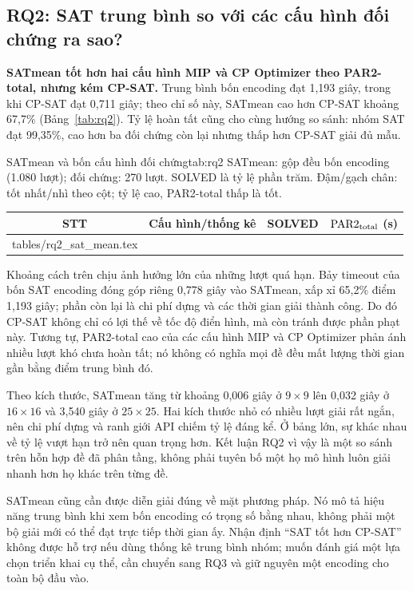 \documentclass[a4paper]{cas-sc}
\makeatletter
\newcommand{\PAR}{\operatorname{PAR2}_{\rm total}}
\newcommand{\tableinput}[1]{\@@input #1 }
\makeatother
\begin{document}
\subsection{RQ2: SAT trung bình so với các cấu hình đối chứng ra sao?}
\textbf{SATmean tốt hơn hai cấu hình MIP và CP Optimizer theo PAR2-total, nhưng kém CP-SAT.} Trung bình bốn encoding đạt 1,193 giây, trong khi CP-SAT đạt 0,711 giây; theo chỉ số này, SATmean cao hơn CP-SAT khoảng 67,7\% (Bảng~\ref{tab:rq2}). Tỷ lệ hoàn tất cũng cho cùng hướng so sánh: nhóm SAT đạt 99,35\%, cao hơn ba đối chứng còn lại nhưng thấp hơn CP-SAT giải đủ mẫu.

\begin{reporttable}{SATmean và bốn cấu hình đối chứng}{tab:rq2}{%
SATmean: gộp đều bốn encoding (1.080 lượt); đối chứng: 270 lượt. SOLVED là tỷ lệ phần trăm. Đậm/gạch chân: tốt nhất/nhì theo cột; tỷ lệ cao, PAR2-total thấp là tốt.}
\begin{tabular}{|c|l|c|c|}
\hline
\textbf{STT} & \textbf{Cấu hình/thống kê} & \textbf{SOLVED} & $\PAR$ (s)\\\hline
\tableinput{tables/rq2_sat_mean.tex}\hline
\end{tabular}
\end{reporttable}

Khoảng cách trên chịu ảnh hưởng lớn của những lượt quá hạn. Bảy timeout của bốn SAT encoding đóng góp riêng 0,778 giây vào SATmean, xấp xỉ 65,2\% điểm 1,193 giây; phần còn lại là chi phí dựng và các thời gian giải thành công. Do đó CP-SAT không chỉ có lợi thế về tốc độ điển hình, mà còn tránh được phần phạt này. Tương tự, PAR2-total cao của các cấu hình MIP và CP Optimizer phản ánh nhiều lượt khó chưa hoàn tất; nó không có nghĩa mọi đề đều mất lượng thời gian gần bằng điểm trung bình đó.

Theo kích thước, SATmean tăng từ khoảng 0,006 giây ở $9\times9$ lên 0,032 giây ở $16\times16$ và 3,540 giây ở $25\times25$. Hai kích thước nhỏ có nhiều lượt giải rất ngắn, nên chi phí dựng và ranh giới API chiếm tỷ lệ đáng kể. Ở bảng lớn, sự khác nhau về tỷ lệ vượt hạn trở nên quan trọng hơn. Kết luận RQ2 vì vậy là một so sánh trên hỗn hợp đề đã phân tầng, không phải tuyên bố một họ mô hình luôn giải nhanh hơn họ khác trên từng đề.

SATmean cũng cần được diễn giải đúng về mặt phương pháp. Nó mô tả hiệu năng trung bình khi xem bốn encoding có trọng số bằng nhau, không phải một bộ giải mới có thể đạt trực tiếp thời gian ấy. Nhận định ``SAT tốt hơn CP-SAT'' không được hỗ trợ nếu dùng thống kê trung bình nhóm; muốn đánh giá một lựa chọn triển khai cụ thể, cần chuyển sang RQ3 và giữ nguyên một encoding cho toàn bộ đầu vào.
\end{document}
